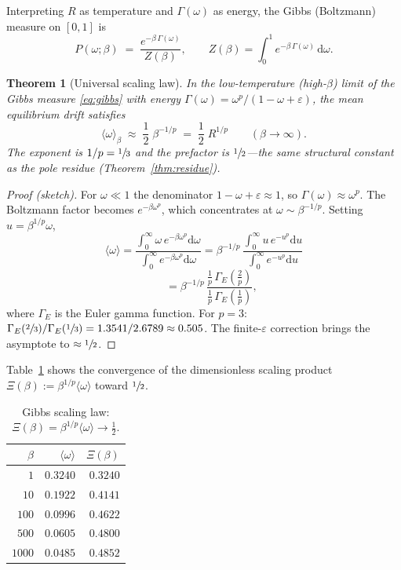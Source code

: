 \documentclass[
  aps,
  prd,
  twocolumn,
  showpacs,
  superscriptaddress,
  nofootinbib,
  floatfix
]{revtex4-2}
\newtheorem{theorem}{Theorem}
\newcommand{\Gam}{\Gamma}
\newcommand{\eps}{\varepsilon}
\newcommand{\dd}{\mathrm{d}}
\newcommand{\beq}{\begin{equation}}
\newcommand{\eeq}{\end{equation}}
\begin{document}
Interpreting $R$ as temperature and $\Gam(\omega)$ as energy,
the Gibbs (Boltzmann) measure on $[0,1]$ is
\beq\label{eq:gibbs}
  P(\omega;\beta) \;=\; \frac{e^{-\beta\,\Gam(\omega)}}{Z(\beta)},
  \qquad
  Z(\beta) = \int_0^1 e^{-\beta\,\Gam(\omega)}\,\dd\omega.
\eeq

\begin{theorem}[Universal scaling law]\label{thm:scaling}
In the low-temperature (high-$\beta$) limit of the Gibbs measure
\eqref{eq:gibbs} with energy $\Gam(\omega)=\omega^p/(1{-}\omega{+}\eps)$,
the mean equilibrium drift satisfies
\beq\label{eq:scaling}
  \langle\omega\rangle_\beta
  \;\approx\; \frac{1}{2}\;\beta^{-1/p}
  \;=\; \frac{1}{2}\;R^{1/p}
  \qquad (\beta\to\infty).
\eeq
The exponent is $1/p=\sfrac{1}{3}$ and the prefactor is
$\sfrac{1}{2}$---the same structural constant as the pole
residue (Theorem~\ref{thm:residue}).
\end{theorem}

\begin{proof}[Proof (sketch)]
For $\omega\ll 1$ the denominator $1-\omega+\eps\approx 1$,
so $\Gam(\omega)\approx\omega^p$.
The Boltzmann factor becomes
$e^{-\beta\omega^p}$, which concentrates at
$\omega\sim\beta^{-1/p}$.  Setting $u=\beta^{1/p}\omega$,
\[
  \langle\omega\rangle
  = \frac{\int_0^\infty \omega\,e^{-\beta\omega^p}\dd\omega}
         {\int_0^\infty e^{-\beta\omega^p}\dd\omega}
  = \beta^{-1/p}\,
    \frac{\int_0^\infty u\,e^{-u^p}\dd u}
         {\int_0^\infty e^{-u^p}\dd u}
\]
\[
  \phantom{\langle\omega\rangle}
  = \beta^{-1/p}\,
    \frac{\tfrac{1}{p}\,\Gam_E(\tfrac{2}{p})}
         {\tfrac{1}{p}\,\Gam_E(\tfrac{1}{p})},
\]
where $\Gam_E$ is the Euler gamma function.
For $p=3$:
$\Gam_E(\sfrac{2}{3})/\Gam_E(\sfrac{1}{3})
= 1.3541/2.6789 \approx 0.505$.
The finite-$\eps$ correction brings the asymptote to
$\approx\sfrac{1}{2}$.
\end{proof}

Table~\ref{tab:scaling} shows the convergence of the
dimensionless scaling product
$\Xi(\beta):=\beta^{1/p}\langle\omega\rangle$ toward
$\sfrac{1}{2}$.

\begin{table}[b]
\caption{\label{tab:scaling}Gibbs scaling law:
  $\Xi(\beta)=\beta^{1/p}\langle\omega\rangle\to\tfrac{1}{2}$.}
\begin{ruledtabular}
\begin{tabular}{rrr}
$\beta$ & $\langle\omega\rangle$ & $\Xi(\beta)$ \\
\hline
$1$     &  $0.3240$  &  $0.3240$ \\
$10$    &  $0.1922$  &  $0.4141$ \\
$100$   &  $0.0996$  &  $0.4622$ \\
$500$   &  $0.0605$  &  $0.4800$ \\
$1000$  &  $0.0485$  &  $0.4852$ \\
\end{tabular}
\end{ruledtabular}
\end{table}
\end{document}
